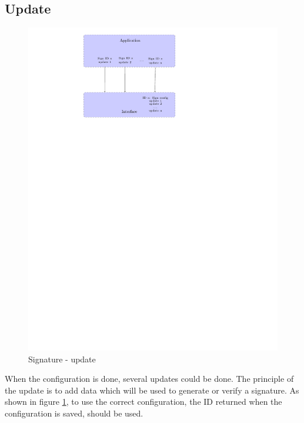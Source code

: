 \subsection*{Update}
\begin{figure}[!ht]
\centering
\includegraphics[trim=8cm 20cm 9.5cm 0cm]{figures/sign_example_update.pdf}
\caption{Signature - update\newline}
\label{fig:gci_sign_update}
\end{figure}
When the configuration is done, several updates could be done.\newline
The principle of the update is to add data which will be used to generate or
verify a signature.\newline
As shown in figure \ref{fig:gci_sign_update}, to use the correct configuration,
the ID returned when the configuration is saved, should be used.\newline
\newpage
